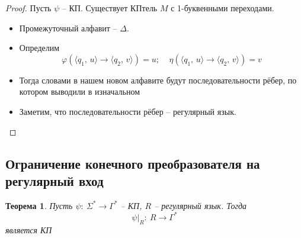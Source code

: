 \documentclass[a4paper,12pt]{article}
\renewcommand{\phi}{\ensuremath{\varphi}}
\theoremstyle{plain}
\newtheorem{theorem}{Теорема}[subsection]
\theoremstyle{definition}
\theoremstyle{remark}
\begin{document}
\begin{proof}
	Пусть $\psi$ -- КП. Существует КПтель $M$ с 1-буквенными переходами.

	\begin{itemize}
		\item Промежуточный алфавит -- $\Delta$.
		\item Определим
		      \[
			      \phi(\langle q_1,\,u\rangle \to \langle q_2,\, v\rangle) = u;\;\;\;\;\eta(\langle q_1,\,u\rangle \to \langle q_2,\, v\rangle) = v
		      \]
		\item Тогда словами в нашем новом алфавите будут последовательности рёбер, по котором выводили в изначальном
		\item Заметим, что последовательности рёбер -- регулярный язык.
	\end{itemize}
\end{proof}

\subsection{Ограничение конечного преобразователя на регулярный вход}
\begin{theorem}
	Пусть $\psi :\: \Sigma^* \to \Gamma^*$ -- КП, $R$ -- регулярный язык. Тогда
	\[
		\psi\vert_R:\:R\to\Gamma^*
	\]
	является КП
\end{theorem}
\end{document}
